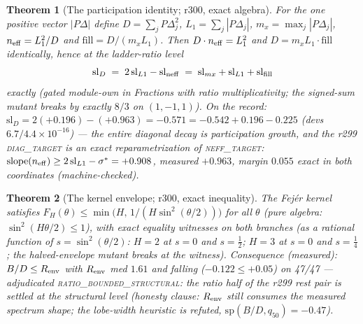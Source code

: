 \documentclass[11pt]{article}
\newtheorem{theorem}{Theorem}[section]
\theoremstyle{definition}
\theoremstyle{remark}
\begin{document}
\begin{theorem}[The participation identity; r300, exact algebra]
\label{thm:participation}
For the one positive vector $|P\Delta|$ define $D = \sum_j
P\Delta_j^2$, $L_1 = \sum_j |P\Delta_j|$, $m_x = \max_j |P\Delta_j|$,
$n_{\rm eff} = L_1^2/D$ and $\mathrm{fill} = D/(m_x L_1)$.  Then
$D \cdot n_{\rm eff} = L_1^2$ and $D = m_x L_1 \cdot \mathrm{fill}$
identically, hence at the ladder-ratio level
\[
\mathrm{sl}_D \;=\; 2\,\mathrm{sl}_{L1} - \mathrm{sl}_{\rm neff}
\;=\; \mathrm{sl}_{mx} + \mathrm{sl}_{L1} + \mathrm{sl}_{\rm fill}
\]
exactly (gated module-own in Fractions with ratio multiplicativity;
the signed-sum mutant breaks by exactly $8/3$ on $(1,-1,1)$).  On the
record: $\mathrm{sl}_D = 2(+0.196) - (+0.963) = -0.571 = -0.542 +
0.196 - 0.225$ (devs $6.7/4.4\times10^{-16}$) --- \emph{the entire
diagonal decay is participation growth}, and the r299
\textsc{diag\_target} is an exact reparametrization of
\textsc{neff\_target}: $\mathrm{slope}(n_{\rm eff}) \ge
2\,\mathrm{sl}_{L1} - \sigma^* = +0.908$, measured $+0.963$, margin
$0.055$ exact in \emph{both} coordinates (machine-checked).
\end{theorem}

\begin{theorem}[The kernel envelope; r300, exact inequality]
\label{thm:envelope}
The Fej\'er kernel satisfies $F_H(\theta) \le \min\!\big(H,\,
1/(H\sin^2(\theta/2))\big)$ for all $\theta$ (pure algebra:
$\sin^2(H\theta/2) \le 1$), with exact equality witnesses on both
branches (as a rational function of $s = \sin^2(\theta/2)$: $H = 2$
at $s = 0$ and $s = \tfrac12$; $H = 3$ at $s = 0$ and $s = \tfrac14$;
the halved-envelope mutant breaks at the witness).  Consequence
(measured): $B/D \le R_{\rm env}$ with $R_{\rm env}$ med $1.61$ and
\emph{falling} ($-0.122 \le +0.05$) on 47/47 --- adjudicated
\textsc{ratio\_bounded\_structural}: the ratio half of the r299 rest
pair is settled at the structural level (honesty clause: $R_{\rm
env}$ still consumes the measured spectrum shape; the lobe-width
heuristic is refuted, $\mathrm{sp}(B/D, q_{50}) = -0.47$).
\end{theorem}
\end{document}
